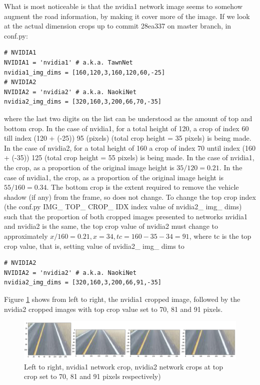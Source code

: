 What is most noticeable is that the nvidia1 network image seems to somehow augment the road information, by making it cover more of the image.
If we look at the actual dimension crops up to commit 28ea337 on master branch, in conf.py:
\begin{verbatim}
# NVIDIA1
NVIDIA1 = 'nvidia1' # a.k.a. TawnNet
nvidia1_img_dims = [160,120,3,160,120,60,-25]
# NVIDIA2
NVIDIA2 = 'nvidia2' # a.k.a. NaokiNet
nvidia2_img_dims = [320,160,3,200,66,70,-35]
\end{verbatim}
where the last two digits on the list can be understood as the amount of top and bottom crop. In the case of nvidia1, for a total height of 120, a crop of index 60 till index (120 + (-25)) 95 (pixels) (total crop height = 35 pixels) is being made.
In the case of nvidia2, for a total height of 160 a crop of index 70 until index (160 + (-35)) 125 (total crop height = 55 pixels) is being made. 
In the case of nvidia1, the crop, as a proportion of the original image height is $35/120=0.21$.  
In the case of nvidia1, the crop, as a proportion of the original image height is $55/160=0.34$.
The bottom crop is the extent required to remove the vehicle shadow (if any) from the frame, so does not change. To change the top crop index (the conf.py IMG\_ TOP\_ CROP\_ IDX index value of nvidia2\_ img\_ dims) such that the proportion of both cropped images presented to networks nvidia1 and nvidia2 is the same, the top crop value of nvidia2 must change to approximately $x/160=0.21, x=34, tc=160-35-34=91$, where tc is the top crop value, that is, setting value of nvidia2\_ img\_ dims to
\begin{verbatim}
# NVIDIA2
NVIDIA2 = 'nvidia2' # a.k.a. NaokiNet
nvidia2_img_dims = [320,160,3,200,66,91,-35]
\end{verbatim}
Figure \ref{fig:nvidia1x1_nvidia2x3_crops} shows from left to right, the nvidia1 cropped image, followed by the nvidia2 cropped images with top crop value set to 70, 81 and 91 pixels. 
\begin{figure}[ht]
 \centering 
 \includegraphics[width=\textwidth]{Figures/nvidia1x1_nvidia2x3_crops.png}
 \caption{Left to right, nvidia1 network crop, nvidia2 network crops at top crop set to 70, 81 and 91 pixels respectively)}
 \label{fig:nvidia1x1_nvidia2x3_crops}
\end{figure}

